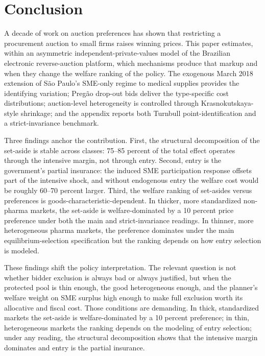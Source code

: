 \section{Conclusion}\label{sec:conclusion}

A decade of work on auction preferences has shown that restricting a procurement auction to small firms raises winning prices. This paper estimates, within an asymmetric independent-private-values model of the Brazilian electronic reverse-auction platform, which mechanisms produce that markup and when they change the welfare ranking of the policy. The exogenous March 2018 extension of S\~ao Paulo's SME-only regime to medical supplies provides the identifying variation; Preg\~ao drop-out bids deliver the type-specific cost distributions; auction-level heterogeneity is controlled through Krasnokutskaya-style shrinkage; and the appendix reports both Turnbull point-identification and a strict-invariance benchmark.

Three findings anchor the contribution. First, the structural decomposition of the set-aside is stable across classes: 75--85 percent of the total effect operates through the intensive margin, not through entry. Second, entry is the government's partial insurance: the induced SME participation response offsets part of the intensive shock, and without endogenous entry the welfare cost would be roughly 60--70 percent larger. Third, the welfare ranking of set-asides versus preferences is goods-characteristic-dependent. In thicker, more standardized non-pharma markets, the set-aside is welfare-dominated by a 10 percent price preference under both the main and strict-invariance readings. In thinner, more heterogeneous pharma markets, the preference dominates under the main equilibrium-selection specification but the ranking depends on how entry selection is modeled.

These findings shift the policy interpretation. The relevant question is not whether bidder exclusion is always bad or always justified, but when the protected pool is thin enough, the good heterogeneous enough, and the planner's welfare weight on SME surplus high enough to make full exclusion worth its allocative and fiscal cost. Those conditions are demanding. In thick, standardized markets the set-aside is welfare-dominated by a 10 percent preference; in thin, heterogeneous markets the ranking depends on the modeling of entry selection; under any reading, the structural decomposition shows that the intensive margin dominates and entry is the partial insurance.
